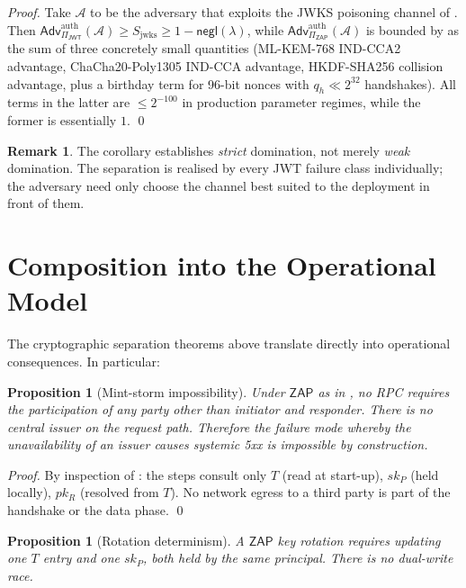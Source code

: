 \documentclass[11pt,a4paper]{article}
\theoremstyle{plain}
\newtheorem{proposition}[theorem]{Proposition}
\theoremstyle{definition}
\newtheorem{remark}[theorem]{Remark}
\newcommand{\Adv}{\mathsf{Adv}}
\newcommand{\JWT}{\mathsf{JWT}}
\newcommand{\ZAP}{\mathsf{ZAP}}
\newcommand{\negl}{\mathsf{negl}}
\begin{document}
\begin{proof}
Take $\mathcal{A}$ to be the adversary that exploits the JWKS poisoning
channel of . Then
$\Adv_{\Pi_\JWT}^{\text{auth}}(\mathcal{A}) \ge S_{\text{jwks}} \ge 1 - \negl(\lambda)$,
while
$\Adv_{\Pi_\ZAP}^{\text{auth}}(\mathcal{A})$ is bounded by
 as the sum of three concretely small quantities (ML-KEM-768
IND-CCA2 advantage, ChaCha20-Poly1305 IND-CCA advantage, HKDF-SHA256
collision advantage, plus a birthday term for 96-bit nonces with $q_h
\ll 2^{32}$ handshakes). All terms in the latter are $\le 2^{-100}$ in
production parameter regimes, while the former is essentially $1$. \qed
\end{proof}

\begin{remark}
The corollary establishes \emph{strict} domination, not merely
\emph{weak} domination. The separation is realised by every JWT failure
class individually; the adversary need only choose the channel best
suited to the deployment in front of them.
\end{remark}

\section{Composition into the Operational Model}
\label{sec:opmodel}

The cryptographic separation theorems above translate directly into
operational consequences. In particular:

\begin{proposition}[Mint-storm impossibility]
\label{prop:mintstorm}
Under $\ZAP$ as in , no RPC requires the participation of
any party other than initiator and responder. There is no central
issuer on the request path. Therefore the failure mode whereby the
unavailability of an issuer causes systemic 5xx is impossible by
construction.
\end{proposition}

\begin{proof}
By inspection of : the steps consult only $T$ (read at
start-up), $sk_P$ (held locally), $pk_R$ (resolved from $T$). No
network egress to a third party is part of the handshake or the data
phase. \qed
\end{proof}

\begin{proposition}[Rotation determinism]
\label{prop:rotation}
A $\ZAP$ key rotation requires updating one $T$ entry and one $sk_P$,
both held by the same principal. There is no dual-write race.
\end{proposition}
\end{document}
